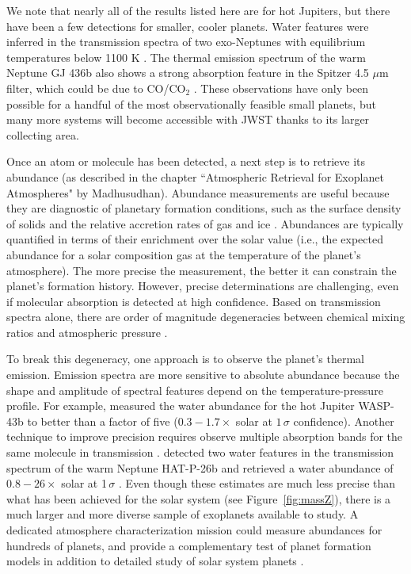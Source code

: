 \documentclass[graybox,natbib,nosecnum]{svmult}
\begin{document}
We note that nearly all of the results listed here are for hot Jupiters, but there have been a few detections for smaller, cooler planets. Water features were inferred in the transmission spectra of two exo-Neptunes with equilibrium temperatures below 1100 K \citep{fraine14, wakeford17}. The thermal emission spectrum of the warm Neptune GJ 436b also shows a strong absorption feature in the Spitzer 4.5 $\mu$m filter, which could be due to CO/CO$_2$ \citep{morley17}.  These observations have only been possible for a handful of the most observationally feasible small planets, but many more systems will become accessible with JWST thanks to its larger collecting area. 

Once an atom or molecule has been detected, a next step is to retrieve its abundance (as described in the chapter ``Atmospheric Retrieval for Exoplanet Atmospheres" by Madhusudhan). Abundance measurements are useful because they are diagnostic of planetary formation conditions, such as the surface density of solids and the relative accretion rates of gas and ice \citep[e.g.][]{fortney13, mordasini16}. Abundances are typically quantified in terms of their enrichment over the solar value (i.e., the expected abundance for a solar composition gas at the temperature of the planet's atmosphere).  The more precise the measurement, the better it can constrain the planet's formation history. However, precise determinations are challenging, even if molecular absorption is detected at high confidence.  Based on transmission spectra alone, there are order of magnitude degeneracies between chemical mixing ratios and atmospheric pressure \citep{benneke12, griffith13}.  

To break this degeneracy, one approach is to observe the planet's thermal emission.  Emission spectra are more sensitive to absolute abundance because the shape and amplitude of spectral features depend on the temperature-pressure profile. For example, \cite{stevenson17} measured the water abundance for the hot Jupiter WASP-43b to better than a factor of five  ($0.3 - 1.7\times$ solar at $1\,\sigma$ confidence). Another technique to improve precision requires observe multiple absorption bands for the same molecule in transmission \citep{benneke12}.  \cite{wakeford17} detected two water features in the transmission spectrum of the warm Neptune HAT-P-26b and retrieved a water abundance of $0.8 - 26\times$ solar at 1\,$\sigma$ \citep{wakeford17}. Even though these estimates are much less precise than what has been achieved for the solar system (see Figure \,\ref{fig:massZ}), there is a much larger and more diverse sample of exoplanets available to study.  A dedicated atmosphere characterization mission could measure abundances for hundreds of planets, and provide a complementary test of planet formation models in addition to detailed study of solar system planets \citep{chapman17}. 
\end{document}
